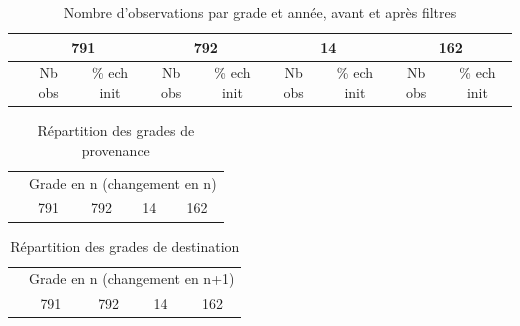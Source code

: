 \documentclass[11pt,a4paper]{article}
\begin{document}
\begin{table}[h!]
\centering
\caption{Nombre d'observations par grade et année, avant et après filtres} 
\label{count_AA}
\begin{tabular}{lcc|cc|cc|cc}
\toprule
 & \multicolumn{2}{c}{791} & \multicolumn{2}{c}{792} & 		  	   \multicolumn{2}{c}{14} & \multicolumn{2}{c}{162} \\
 \midrule
 & Nb obs & \% ech init  & Nb obs & \% ech init & Nb obs & \% ech init & Nb obs & \% ech init  \\

\bottomrule
\end{tabular}
\end{table}





\begin{table}[h!]
\centering
\caption{Répartition des grades de provenance} 
\label{entry}
\begin{tabular}{lcccc}
\toprule
 & \multicolumn{4}{c}{Grade en n (changement en n)} \\
 & 791 & 792 & 14 & 162 \\ 
  \hline
  
   \hline
\bottomrule
\end{tabular}
\end{table}

\medskip


\begin{table}[h!]
\centering
\caption{Répartition des grades de destination} 
\label{exit}
\begin{tabular}{lcccc}
\toprule
 & \multicolumn{4}{c}{Grade en n (changement en n+1)} \\
 & 791 & 792 & 14 & 162 \\ 
  \hline
  
   \hline
\bottomrule
\end{tabular}
\end{table}
\medskip
\end{document}
